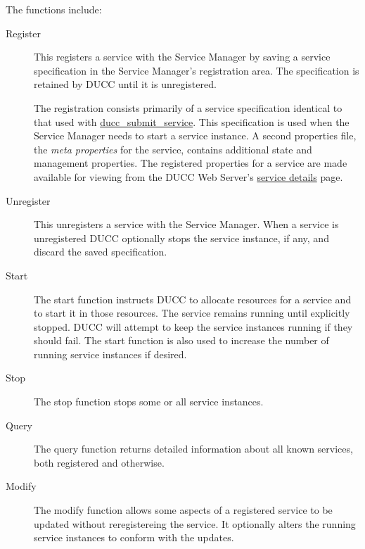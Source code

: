         The functions include: 
        \begin{description}
            \item[Register] This registers a service with the Service Manager by saving a service
              specification in the Service Manager's registration area. The specification is
              retained by DUCC until it is unregistered.

              The registration consists primarily of a service specification identical to that used
              with \hyperref[sec:cli.service-submit]{ducc\_submit\_service}.  This specification is
              used when the Service Manager needs to start a service instance.  A second properties
              file, the {\em meta properties} for the service, contains additional state and
              management properties.  The registered properties for a service are made available for
              viewing from the DUCC Web Server's \hyperref[sec:ws-service-details]{service details}
              page.
              
            \item[Unregister] This unregisters a service with the Service Manager. When a service is
              unregistered DUCC optionally stops the service instance, if any, and discard the
              saved specification.
              
            \item[Start] The start function instructs DUCC to allocate resources for a service and to
              start it in those resources. The service remains running until explicitly stopped. DUCC
              will attempt to keep the service instances running if they should fail. The start function
              is also used to increase the number of running service instances if desired.
              
            \item[Stop] The stop function stops some or all service instances.
              
            \item[Query] The query function returns detailed information about all known services, both
              registered and otherwise.
              
            \item[Modify] The modify function allows some aspects of a registered service to be updated
              without reregistereing the service. It optionally alters the running service instances to
              conform with the updates.    
        \end{description}
            

